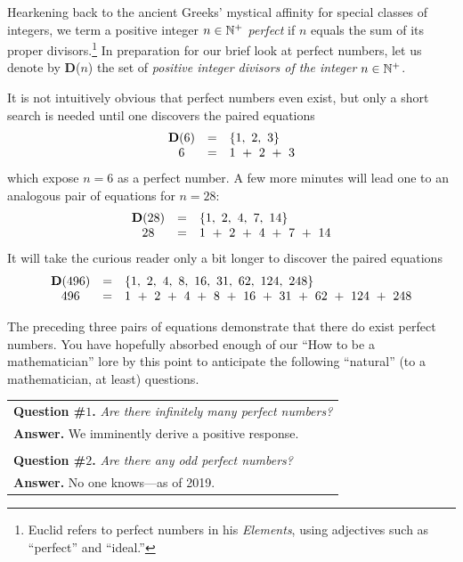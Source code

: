 Hearkening back to the ancient Greeks' mystical affinity for special classes of integers, we term a positive integer $n \in \mathbb{N}^+$ {\it perfect} if $n$ equals the sum of its proper divisors.\footnote{Euclid refers to perfect numbers in his {\it Elements}, using adjectives such as ``perfect'' and ``ideal.''}  In preparation for our brief look at perfect numbers, let us denote by {\bf D}($n$) the set of {\em positive integer divisors of the integer} $n \in \mathbb{N}^+$.

\medskip

It is not intuitively obvious that perfect numbers even exist, but only a short search is needed until one discovers the paired equations
\[ \begin{array}{ccl}
{\bf D}(6) & = & \{ 1, \ 2 , \ 3 \} \\
 6            & = & 1 \ +\ 2 \ + \ 3
\end{array} \]
which expose $n=6$ as a perfect number.  A few more minutes will lead one to an analogous pair of equations for $n=28$:
\[ \begin{array}{ccl}
{\bf D}(28) & = & \{ 1, \ 2, \ 4, \ 7, \ 14\} \\
28              & = &  1 \ + \ 2 \ + \ 4 \ + \ 7\ + \ 14
\end{array} \]
It will take the curious reader only a bit longer to discover the paired equations
\[ \begin{array}{ccl}
{\bf D}(496) & = & \{1, \ 2 , \ 4, \ 8, \ 16, \ 31, \ 62, \ 124, \ 248\} \\
496             & = &  1 \ + \ 2 \ + \ 4 \ + \ 8 \ + \ 16 \ + \ 31 \ + \ 62 \ + \ 124 \ + \ 248
\end{array} \]

\smallskip

The preceding three pairs of equations demonstrate that there do exist perfect numbers.  You have hopefully absorbed enough of our ``How to be a mathematician'' lore by this point to anticipate the following ``natural'' (to a mathematician, at least) questions.

\medskip

\begin{tabular}{l}
{\bf Question \#$1$.}  {\em Are there {\em infinitely many} perfect numbers?} \\
{\bf Answer.}  We imminently derive a positive response. \\
 \\
{\bf Question \#$2$.}  {\em Are there any {\em odd} perfect numbers?} \\
{\bf Answer.}  No one knows---as of 2019.
\end{tabular}

